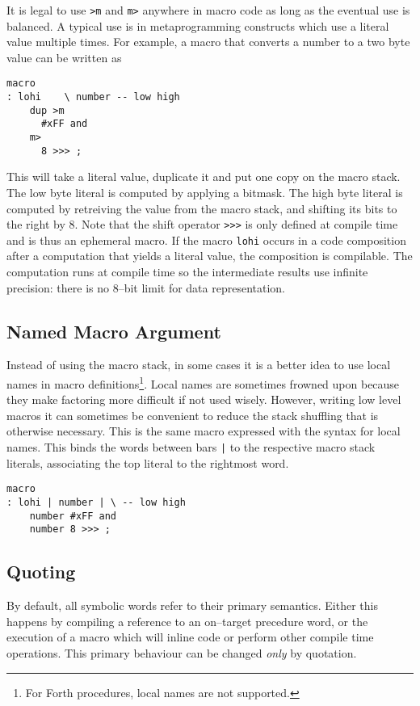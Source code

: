 \documentclass[12pt]{article}
\begin{document}
It is legal to use \verb|>m| and \verb|m>| anywhere in macro code as
long as the eventual use is balanced. A typical use is in
metaprogramming constructs which use a literal value multiple
times. For example, a macro that converts a number to a two byte
value can be written as
\begin{verbatim}
macro
: lohi    \ number -- low high
    dup >m 
      #xFF and
    m> 
      8 >>> ;
\end{verbatim}
This will take a literal value, duplicate it and put one copy on the
macro stack. The low byte literal is computed by applying a
bitmask. The high byte literal is computed by retreiving the value
from the macro stack, and shifting its bits to the right by 8. Note
that the shift operator \verb|>>>| is only defined at compile time and
is thus an ephemeral macro.  If the macro \verb|lohi| occurs in a code
composition after a computation that yields a literal value, the
composition is compilable. The computation runs at compile time so the
intermediate results use infinite precision: there is no 8--bit limit
for data representation.

\subsection{Named Macro Argument}

Instead of using the macro stack, in some cases it is a better idea to
use local names in macro definitions\footnote{For Forth procedures,
  local names are not supported.}. Local names are sometimes frowned
upon because they make factoring more difficult if not used
wisely. However, writing low level macros it can sometimes be
convenient to reduce the stack shuffling that is otherwise
necessary. This is the same macro expressed with the syntax for local
names. This binds the words between bars \verb+|+ to the respective
macro stack literals, associating the top literal to the rightmost
word.
\begin{verbatim}
macro
: lohi | number | \ -- low high
    number #xFF and
    number 8 >>> ;
\end{verbatim}




\subsection{Quoting}

By default, all symbolic words refer to their primary
semantics. Either this happens by compiling a reference to an
on--target precedure word, or the execution of a macro which will
inline code or perform other compile time operations. This primary
behaviour can be changed \emph{only} by quotation.
\end{document}
